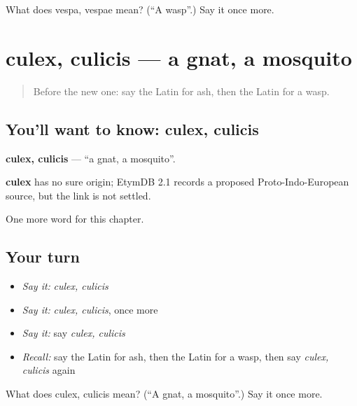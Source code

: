 \begin{tcolorbox}[breakable,colback=teal!4,colframe=teal!35!black,title={Before you move on}]
What does vespa, vespae mean? (\textquotedblleft{}A wasp\textquotedblright{}.) Say it once more.
\end{tcolorbox}
\section[culex, culicis]{culex, culicis — a gnat, a mosquito}

\label{lesson:LA-C276-culex}



\begin{quote}
Before the new one: say the Latin for ash, then the Latin for a wasp.
\end{quote}

\subsection*{You'll want to know: culex, culicis}
\textbf{culex, culicis} — \textquotedblleft{}a gnat, a mosquito\textquotedblright{}.

\begin{cousinweb}
\textbf{culex} has no sure origin; EtymDB 2.1 records a proposed Proto-Indo-European source, but the link is not settled.
\end{cousinweb}

\begin{grammarlens}[title={What you've built}]
One more word for this chapter.
\end{grammarlens}

\subsection*{Your turn}
\begin{itemize}
\raggedright
  \item \emph{Say it:} \emph{culex, culicis}
  \item \emph{Say it:} \emph{culex, culicis}, once more
  \item \emph{Say it:} say \emph{culex, culicis}
  \item \emph{Recall:} say the Latin for ash, then the Latin for a wasp, then say \emph{culex, culicis} again
\end{itemize}

\begin{tcolorbox}[breakable,colback=teal!4,colframe=teal!35!black,title={Before you move on}]
What does culex, culicis mean? (\textquotedblleft{}A gnat, a mosquito\textquotedblright{}.) Say it once more.
\end{tcolorbox}
